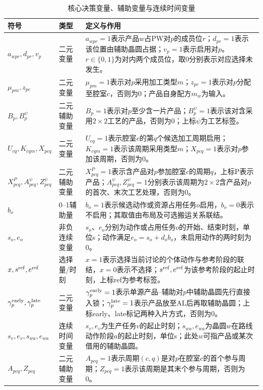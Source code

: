 \documentclass[final,5p,times,twocolumn]{elsarticle}
\begin{document}
\begin{table}[t]
\centering
\scriptsize
\setlength{\tabcolsep}{3pt}
\caption{核心决策变量、辅助变量与连续时间变量}
\label{tab:symbol-cn-b}
\begin{tabular}{C{0.23\textwidth}C{0.10\textwidth}C{0.61\textwidth}}
\toprule
符号 & 类型 & 定义与作用 \\
\midrule
$a_{wpr},d_{pr},v_p$ & 二元变量 & $a_{wpr}=1$表示产品$w$占PW对$p$的成员位$r$；$d_{pr}=1$表示该位置由辅助晶圆占据；$v_p=1$表示启用对$p$。$r\in\{0,1\}$为对内两个成员位，取0分别表示对应选择未发生。\\
$\mu_{pm},z_{pc}$ & 二元变量 & $\mu_{pm}=1$表示对$p$采用加工类型$m$；$z_{pc}=1$表示对$p$分配至腔室$c$，否则为0；产品自身配方$m_w$为输入。\\
$B_p,B_p^{\psi}$ & 二元辅助变量 & $B_p=1$表示对$p$至少含一片产品；$B_p^{\psi}=1$表示该对含采用$2\times2$工艺的产品，否则为0；上标$\psi$为工艺标签。\\
$U_{cq},K_{cqm},X_{pcq}$ & 二元变量 & $U_{cq}=1$表示腔室$c$的第$q$个候选加工周期启用；$K_{cqm}=1$表示该周期采用类型$m$；$X_{pcq}=1$表示对$p$参加该周期，否则为0。\\
$X^P_{pcq},A^{\psi}_{pcq},Z^{\psi}_{pcq}$ & 二元辅助变量 & $X^P_{pcq}=1$表示含产品对$p$参加腔室$c$的周期$q$，上标P表示产品；$A^{\psi}_{pcq},Z^{\psi}_{pcq}=1$分别表示该周期为$2\times2$含产品对$p$的首次、末次工艺处理，否则为0。\\
$b_o$ & 0--1辅助量 & $b_o=1$表示候选动作或资源占用任务$o$启用，$b_o=0$表示不启用；其取值由布局及可选搬运关系联结。\\
$s_o,e_o$ & 非负连续变量 & $s_o$、$e_o$分别为动作或占用任务$o$的开始、结束时刻，单位s；动作满足$e_o=s_o+d_ob_o$，未启用动作的两时刻为0。\\
$x,s^{\rm ref},e^{\rm ref}$ & 选择量/时刻 & $x=1$表示选择当前讨论的个体动作与参考阶段的联结，$x=0$表示不选择；$s^{\rm ref},e^{\rm ref}$为该参考阶段的起止时刻，上标ref为参考标签。\\
$\gamma^{\rm early}_p,\gamma^{\rm late}_p$ & 二元变量 & $\gamma^{\rm early}_p=1$表示单源产品--辅助对$p$中辅助晶圆先行直接入锁；$\gamma^{\rm late}_p=1$表示产品放至AL后再取辅助晶圆；上标early、late标记两种入片方式，否则为0。\\
$s_v,e_v,s_{wa},e_{wa}$ & 连续时间变量 & $s_v,e_v$为生产任务$v$的起止时刻；$s_{wa},e_{wa}$为晶圆$w$在路线动作阶段$a$的起止时刻，单位s；此处$w$可指产品或某次借用的辅助晶圆。\\
$A_{pcq},Z_{pcq}$ & 二元辅助变量 & $A_{pcq}=1$表示周期$(c,q)$是对$p$在腔室$c$的首个参与周期；$Z_{pcq}=1$表示该周期是其末个参与周期，否则为0。\\

\end{tabular}
\end{table}
\end{document}

